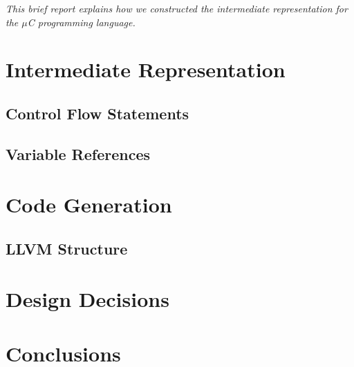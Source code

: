 \textit{This brief report explains how we constructed the intermediate representation for the $\mu$C programming language.}

\section{Intermediate Representation}

\subsection{Control Flow Statements}

\subsection{Variable References}

\section{Code Generation}

\subsection{LLVM Structure}

\section{Design Decisions}

\section{Conclusions}
